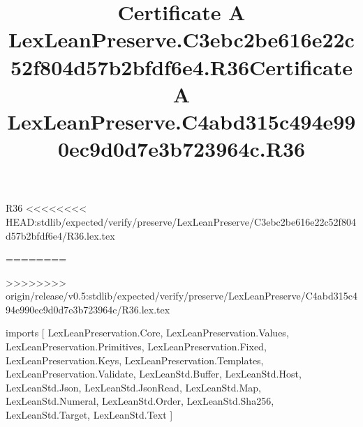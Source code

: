\begin{lexlean}{R36}
<<<<<<<< HEAD:stdlib/expected/verify/preserve/LexLeanPreserve/C3ebc2be616e22c52f804d57b2bfdf6e4/R36.lex.tex
\title{Certificate A LexLeanPreserve.C3ebc2be616e22c52f804d57b2bfdf6e4.R36}
========
\title{Certificate A LexLeanPreserve.C4abd315c494e990ec9d0d7e3b723964c.R36}
>>>>>>>> origin/release/v0.5:stdlib/expected/verify/preserve/LexLeanPreserve/C4abd315c494e990ec9d0d7e3b723964c/R36.lex.tex
\begin{coremodule}
imports [
  LexLeanPreservation.Core,
  LexLeanPreservation.Values,
  LexLeanPreservation.Primitives,
  LexLeanPreservation.Fixed,
  LexLeanPreservation.Keys,
  LexLeanPreservation.Templates,
  LexLeanPreservation.Validate,
  LexLeanStd.Buffer,
  LexLeanStd.Host,
  LexLeanStd.Json,
  LexLeanStd.JsonRead,
  LexLeanStd.Map,
  LexLeanStd.Numeral,
  LexLeanStd.Order,
  LexLeanStd.Sha256,
  LexLeanStd.Target,
  LexLeanStd.Text
]


\end{coremodule}
\end{lexlean}
